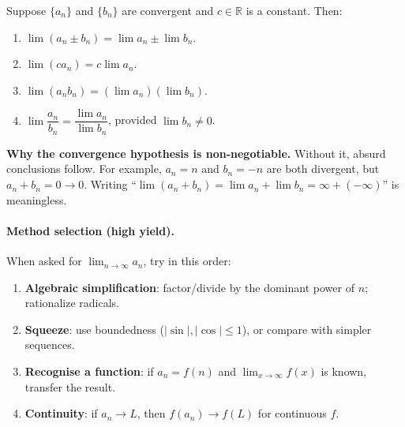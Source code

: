 \begin{keyformula}[title={Limit laws for sequences (require convergence)}]

Suppose $\{a_n\}$ and $\{b_n\}$ are convergent and $c\in\mathbb{R}$ is a constant. Then:

\begin{enumerate}[label=(\alph*), leftmargin=3em]

\item $\lim (a_n\pm b_n)=\lim a_n \pm \lim b_n$.

\item $\lim (c a_n)=c\lim a_n$.

\item $\lim (a_n b_n)=(\lim a_n)(\lim b_n)$.

\item $\lim \dfrac{a_n}{b_n}=\dfrac{\lim a_n}{\lim b_n}$, provided $\lim b_n\ne 0$.

\end{enumerate}

\end{keyformula}

\noindent
\textbf{Why the convergence hypothesis is non-negotiable.}
Without it, absurd conclusions follow. For example, $a_n=n$ and $b_n=-n$ are both divergent, but $a_n+b_n=0\to 0$. Writing ``$\lim(a_n+b_n)=\lim a_n+\lim b_n=\infty+(-\infty)$'' is meaningless.

\paragraph{Method selection (high yield).}

When asked for $\lim_{n\to\infty} a_n$, try in this order:

\begin{enumerate}[leftmargin=3em]

\item \textbf{Algebraic simplification}: factor/divide by the dominant power of $n$; rationalize radicals.

\item \textbf{Squeeze}: use boundedness ($|\sin|,|\cos|\le 1$), or compare with simpler sequences.

\item \textbf{Recognise a function}: if $a_n=f(n)$ and $\lim_{x\to\infty} f(x)$ is known, transfer the result.

\item \textbf{Continuity}: if $a_n\to L$, then $f(a_n)\to f(L)$ for continuous $f$.

\end{enumerate}


